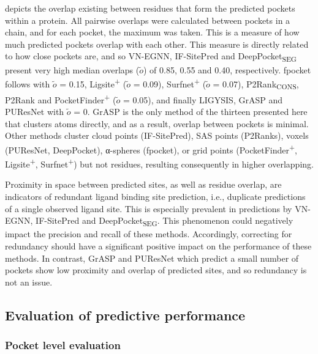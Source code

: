  depicts the overlap existing between residues that form the predicted pockets within a protein. All pairwise overlaps were calculated between pockets in a chain, and for each pocket, the maximum was taken. This is a measure of how much predicted pockets overlap with each other. This measure is directly related to how close pockets are, and so VN-EGNN, IF-SitePred and DeepPocket\textsubscript{SEG} present very high median overlaps ($\tilde{\textit{o}}$) of 0.85, 0.55 and 0.40, respectively. fpocket follows with $\tilde{\textit{o}}$ = 0.15, Ligsite\textsuperscript{+} ($\tilde{\textit{o}}$ = 0.09), Surfnet\textsuperscript{+} ($\tilde{\textit{o}}$ = 0.07), P2Rank\textsubscript{CONS}, P2Rank and PocketFinder\textsuperscript{+} ($\tilde{\textit{o}}$ = 0.05), and finally LIGYSIS, GrASP and PUResNet with $\tilde{\textit{o}}$ = 0. GrASP is the only method of the thirteen presented here that clusters atoms directly, and as a result, overlap between pockets is minimal. Other methods cluster cloud points (IF-SitePred), SAS points (P2Ranks), voxels (PUResNet, DeepPocket), α-spheres (fpocket), or grid points (PocketFinder\textsuperscript{+}, Ligsite\textsuperscript{+}, Surfnet\textsuperscript{+}) but not residues, resulting consequently in higher overlapping.

Proximity in space between predicted sites, as well as residue overlap, are indicators of redundant ligand binding site prediction, i.e., duplicate predictions of a single observed ligand site. This is especially prevalent in predictions by VN-EGNN, IF-SitePred and DeepPocket\textsubscript{SEG}. This phenomenon could negatively impact the precision and recall of these methods. Accordingly, correcting for redundancy should have a significant positive impact on the performance of these methods. In contrast, GrASP and PUResNet which predict a small number of pockets show low proximity and overlap of predicted sites, and so redundancy is not an issue.

\subsection{Evaluation of predictive performance}

\subsubsection{Pocket level evaluation}


